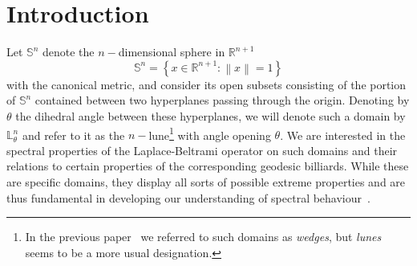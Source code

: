\documentclass[11pt,a4paper,times]{amsart}
\theoremstyle{plain}
\theoremstyle{definition}
\numberwithin{equation}{section}
\newcommand{\R}{\mathbb{R}}
\newcommand{\Se}{\mathbb{S}}
\newcommand{\lune}[2]{\mathbb{L}^{#1}_{#2}}
\begin{document}
\section{Introduction}\label{INTROGERAL}
Let $\Se^n$ denote the $n-$dimensional sphere in $\R^{n+1}$
\[
 \Se^{n} = \left\{ x\in\R^{n+1}: \left\| x \right\| = 1\right\}
\]
with the canonical metric, and consider its open subsets consisting of the portion of
$\Se^n$ contained between two hyperplanes passing
through {the} origin. Denoting by $\theta$ the dihedral angle between these
hyperplanes, we will denote such a domain by $\lune{n}{\theta}$ and refer to it as the $n-$lune\footnote{In the
previous paper~\cite{fms} we referred to such domains as {\it wedges}, but {\it lunes} seems to be a more usual
designation.} with angle opening $\theta$. We are interested in the spectral properties of the Laplace-Beltrami
operator on such domains and their relations to certain properties of the corresponding geodesic billiards.
While these are specific domains, they display all sorts of possible extreme properties and are thus fundamental
in developing our understanding of spectral behaviour~\cite{horm,sava}.
\end{document}
